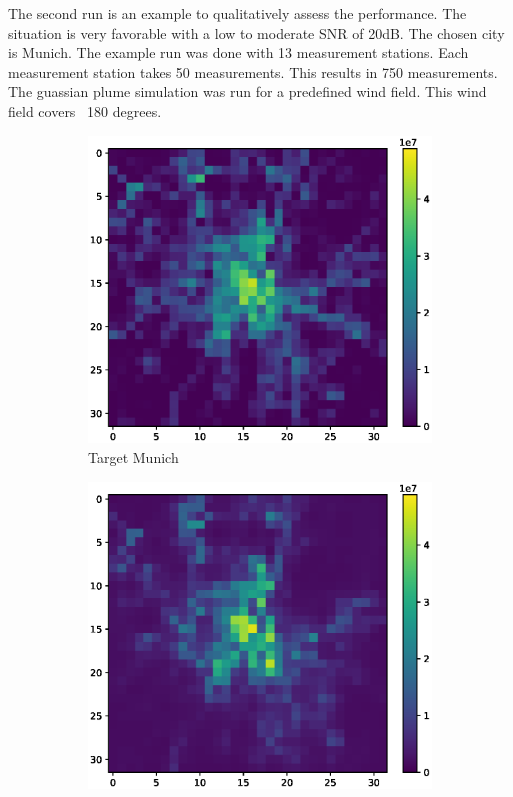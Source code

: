 The second run is an example to qualitatively assess the performance.
The situation is very favorable with a low to moderate SNR of 20dB.
The chosen city is Munich.
The example run was done with 13 measurement stations.
Each measurement station takes 50 measurements.
This results in 750 measurements.
The guassian plume simulation was run for a predefined wind field.
This wind field covers ~180 degrees.
\begin{figure}
    \centering
    \begin{subfigure}[b]{0.32\textwidth}
        \includegraphics[width=\textwidth]{figures/06_results/gaussian_plume_example/munich/target.eps}
        \caption{Target Munich}
    \end{subfigure}
    \begin{subfigure}[b]{0.32\textwidth}
        \includegraphics[width=\textwidth]{figures/06_results/gaussian_plume_example/munich/gen_2048_fine_tuned_20_db.eps}

\end{subfigure}
\end{figure}
